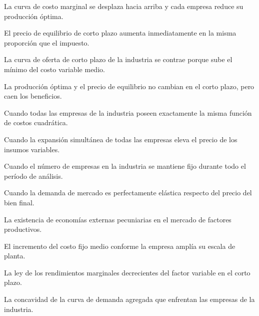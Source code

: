 \begin{opts}
    \item La curva de costo marginal se desplaza hacia arriba y cada empresa reduce su producción óptima.
    \item El precio de equilibrio de corto plazo aumenta inmediatamente en la misma proporción que el impuesto.
    \item La curva de oferta de corto plazo de la industria se contrae porque sube el mínimo del costo variable medio.
    \item La producción óptima y el precio de equilibrio no cambian en el corto plazo, pero caen los beneficios.
\end{opts}

\begin{opts}
    \item Cuando todas las empresas de la industria poseen exactamente la misma función de costos cuadrática.
    \item Cuando la expansión simultánea de todas las empresas eleva el precio de los insumos variables.
    \item Cuando el número de empresas en la industria se mantiene fijo durante todo el período de análisis.
    \item Cuando la demanda de mercado es perfectamente elástica respecto del precio del bien final.
\end{opts}

\begin{opts}
    \item La existencia de economías externas pecuniarias en el mercado de factores productivos.
    \item El incremento del costo fijo medio conforme la empresa amplía su escala de planta.
    \item La ley de los rendimientos marginales decrecientes del factor variable en el corto plazo.
    \item La concavidad de la curva de demanda agregada que enfrentan las empresas de la industria.
\end{opts}

